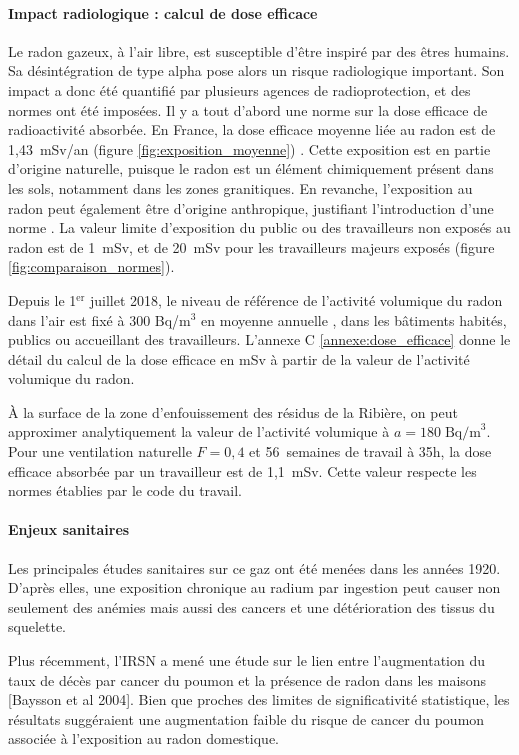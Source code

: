 \documentclass{article}
\begin{document}
\paragraph{Impact radiologique : calcul de dose efficace} Le radon gazeux, à l’air libre, est susceptible d’être inspiré par des êtres humains. Sa désintégration de type alpha pose alors un risque radiologique important. Son impact a donc été quantifié par plusieurs agences de radioprotection, et des normes ont été imposées. Il y a tout d’abord une norme sur la dose efficace de radioactivité absorbée. En France, la dose efficace moyenne liée au radon est de 1,43~mSv/an (figure \ref{fig:exposition_moyenne}) \cite{irsn_quelle_nodate}. Cette exposition est en partie d’origine naturelle, puisque le radon est un élément chimiquement présent dans les sols, notamment dans les zones granitiques. En revanche, l’exposition au radon peut également être d’origine anthropique, justifiant l'introduction d'une norme \cite{inrs_rayonnements_nodate}. La valeur limite d’exposition du public ou des travailleurs non exposés au radon est de 1~mSv, et de 20~mSv pour les travailleurs majeurs exposés (figure \ref{fig:comparaison_normes}).

Depuis le 1$^{\text{er}}$ juillet 2018, le niveau de référence de l’activité volumique du radon dans l'air est fixé à 300 Bq/m$^3$ en moyenne annuelle \cite{autorite_de_surete_nucleaire_reglementation_nodate}, dans les bâtiments habités, publics ou accueillant des travailleurs. L'annexe C \ref{annexe:dose_efficace} donne le détail du calcul de la dose efficace en mSv à partir de la valeur de l'activité volumique du radon.

À la surface de la zone d’enfouissement des résidus de la Ribière, on peut approximer analytiquement la valeur de l’activité volumique à $a=180 \; \text{Bq/m}^3$. Pour une ventilation naturelle $F=0,4$ et 56~semaines de travail à 35h, la dose efficace absorbée par un travailleur est de 1,1~mSv. Cette valeur respecte les normes établies par le code du travail.

\paragraph{Enjeux sanitaires} Les principales études sanitaires sur ce gaz ont été menées dans les années 1920. D’après elles, une exposition chronique au radium par ingestion peut causer non seulement des anémies mais aussi des cancers et une détérioration des tissus du squelette.

Plus récemment, l’IRSN a mené une étude sur le lien entre l’augmentation du taux de décès par cancer du poumon et la présence de radon dans les maisons [Baysson et al 2004]. Bien que proches des limites de significativité statistique, les résultats suggéraient une augmentation faible du risque de cancer du poumon associée à l’exposition au radon  domestique.%
\end{document}

